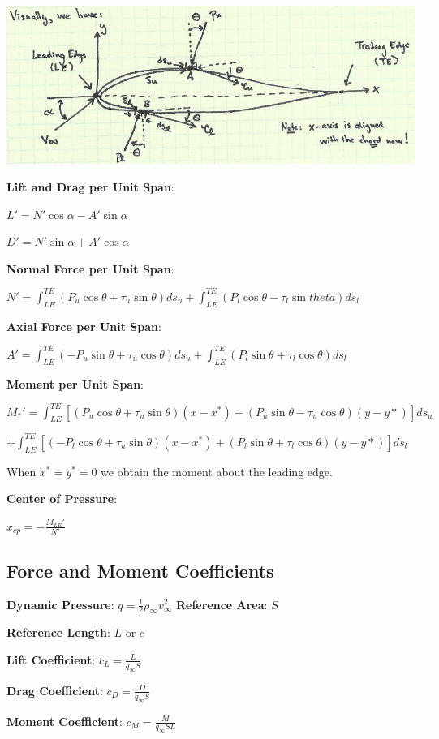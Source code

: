 \documentclass{article}
\begin{document}
\begin{multicols*}{3}
\includegraphics[width=0.5\linewidth]{Images/aero_forces.png}\par
\textbf{Lift and Drag per Unit Span}:\par
$L' = N'\cos{\alpha}-A'\sin{\alpha}$\par
$D' = N'\sin{\alpha}+A'\cos{\alpha}$\par
\textbf{Normal Force per Unit Span}: \par
$N' = \int_{LE}^{TE}(P_u\cos{\theta}+\tau_u\sin{\theta})ds_u+\int_{LE}^{TE}(P_l\cos{\theta}-\tau_l\sin{theta})ds_l$\par
\textbf{Axial Force per Unit Span}: \par
$A' = \int_{LE}^{TE}(-P_u\sin{\theta}+\tau_u\cos{\theta})ds_u+\int_{LE}^{TE}(P_l\sin{\theta}+\tau_l\cos{\theta})ds_l$\par
\textbf{Moment per Unit Span}:\par
$M_*'=\int_{LE}^{TE}\left[ (P_u\cos{\theta}+\tau_u\sin{\theta})(x-x^*)-(P_u\sin{\theta}-\tau_u\cos{\theta})(y-y*)\right]ds_u$ \par$+ \int_{LE}^{TE}\left[(-P_l\cos{\theta}+\tau_u\sin{\theta})(x-x^*)+(P_l\sin{\theta}+\tau_l\cos{\theta})(y-y*)\right]ds_l$\par
When $x^*=y^*=0$ we obtain the moment about the leading edge.\par
\textbf{Center of Pressure}:\par
$x_{cp} = -\frac{M_{LE}'}{N'}$\par

\subsection*{Force and Moment Coefficients}
\textbf{Dynamic Pressure}: $q = \frac{1}{2}\rho_\infty v_\infty^2$
\textbf{Reference Area}: $S$\par
\textbf{Reference Length}: $L$ or $c$\par
\textbf{Lift Coefficient}: $c_L=\frac{L}{q_\infty S}$\par
\textbf{Drag Coefficient}: $c_D = \frac{D}{q_\infty S}$\par
\textbf{Moment Coefficient}: $c_M=\frac{M}{q_\infty S L}$


\end{multicols*}
\end{document}
